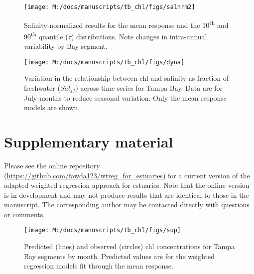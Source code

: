 \documentclass{svjour3}\usepackage[]{graphicx}\usepackage[]{color}
\newcommand{\beginsupplement}{%
        \setcounter{table}{0}
        \renewcommand{\thetable}{S\arabic{table}}%
        \setcounter{figure}{0}
        \renewcommand{\thefigure}{S\arabic{figure}}%
     }
\begin{document}
\begin{figure}[!ht]


{\centering \texttt{[image: M:/docs/manuscripts/tb\_chl/figs/salnrm2]} 

}

\caption[Salinity-normalized results for the mean response and the 10\textsuperscript{th} and 90\textsuperscript{th} quantile ($\tau$) distributions]{Salinity-normalized results for the mean response and the 10\textsuperscript{th} and 90\textsuperscript{th} quantile ($\tau$) distributions. Note changes in intra-annual variability by Bay segment.\label{fig:salnrm2}}
\end{figure}



\begin{figure}[!ht]


{\centering \texttt{[image: M:/docs/manuscripts/tb\_chl/figs/dyna]} 

}

\caption[Variation in the relationship between \ac{chl} and salinity as fraction of freshwater ($Sal_{ff}$) across time series for Tampa Bay]{Variation in the relationship between \ac{chl} and salinity as fraction of freshwater ($Sal_{ff}$) across time series for Tampa Bay. Data are for July months to reduce seasonal variation. Only the mean response models are shown.\label{fig:dyna}}
\end{figure}



\clearpage
\section{Supplementary material}

Please see the online repository (\href{https://github.com/fawda123/wtreg\_for\_estuaries}{https://github.com/fawda123/wtreg\_for\_estuaries}) for a current version of the adapted weighted regression approach for estuaries.  Note that the online version is in development and may not produce results that are identical to those in the manuscript. The corresponding author may be contacted directly with questions or comments.  

\beginsupplement
\begin{landscape}
\centering\vspace*{\fill}
\begin{figure}[!ht]


{\centering \texttt{[image: M:/docs/manuscripts/tb\_chl/figs/sup]} 

}

\caption[Predicted (lines) and observed (circles) \ac{chl} concentrations for Tampa Bay segments by month]{Predicted (lines) and observed (circles) \ac{chl} concentrations for Tampa Bay segments by month.  Predicted values are for the weighted regression models fit through the mean response.\label{fig:sup}}
\end{figure}


\vfill
\end{landscape}
\end{document}
